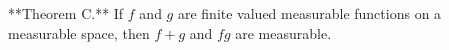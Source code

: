 **Theorem C.** If $f$ and $g$ are finite valued measurable functions on a measurable space, then $f + g$ and $fg$ are measurable.

